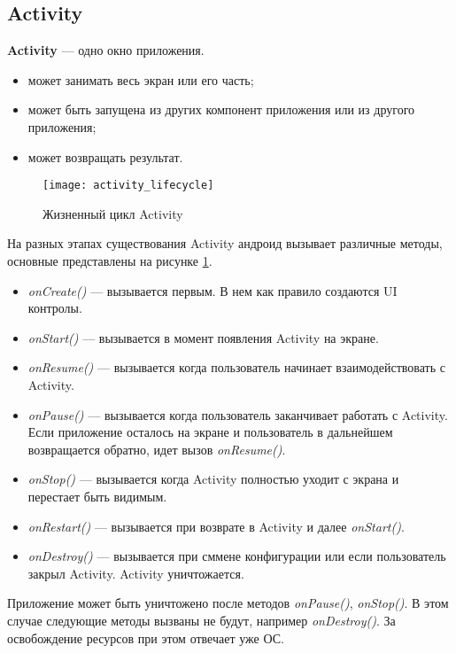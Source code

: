 \subsection{Activity}
\textbf{Activity} --- одно окно приложения.

\begin{itemize}
	\item может занимать весь экран или его часть;
	\item может быть запущена из других компонент приложения или из другого приложения;
	\item может возвращать результат.
\end{itemize}

\begin{figure}[H]
    \centering
    \texttt{[image: activity\_lifecycle]}
    \caption{Жизненный цикл Activity}
    \label{fig:activity_lifecycle}
\end{figure}

На разных этапах существования Activity андроид вызывает различные методы, основные представлены на рисунке \ref{fig:activity_lifecycle}.

\begin{itemize}
	\item \textit{onCreate()} --- вызывается первым. В нем как правило создаются UI контролы.
	\item \textit{onStart()} --- вызывается в момент появления Activity на экране.
	\item \textit{onResume()} --- вызывается когда пользователь начинает взаимодействовать с Activity.
	\item \textit{onPause()} --- вызывается когда пользователь заканчивает работать с Activity. Если приложение осталось на экране и пользователь в дальнейшем возвращается обратно, идет вызов \textit{onResume()}.
	\item \textit{onStop()} --- вызывается когда Activity полностью уходит с экрана и перестает быть видимым.
	\item \textit{onRestart()} --- вызывается при возврате в Activity и далее \textit{onStart()}.
	\item \textit{onDestroy()} --- вызывается при сммене конфигурации или если пользователь закрыл Activity. Activity уничтожается.
\end{itemize}

Приложение может быть уничтожено после методов \textit{onPause()}, \textit{onStop()}. В этом случае следующие методы вызваны не будут, например \textit{onDestroy()}. За освобождение ресурсов при этом отвечает уже ОС.

